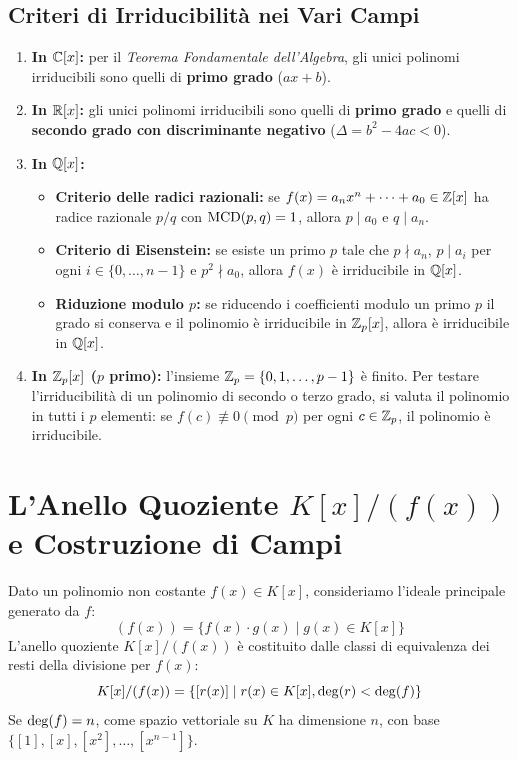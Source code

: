 \subsection{Criteri di Irriducibilità nei Vari Campi}
\begin{enumerate}
    \item \textbf{In $\mathbb{C}[x]$:} per il \emph{Teorema Fondamentale dell'Algebra}, gli unici polinomi irriducibili sono quelli di \textbf{primo grado} ($ax + b$).
    \item \textbf{In $\mathbb{R}[x]$:} gli unici polinomi irriducibili sono quelli di \textbf{primo grado} e quelli di \textbf{secondo grado con discriminante negativo} ($\Delta = b^2 - 4ac < 0$).
    \item \textbf{In $\mathbb{Q}[x]$:}
    \begin{itemize}
        \item \textbf{Criterio delle radici razionali:} se $f(x) = a_n x^n + \dots + a_0 \in \mathbb{Z}[x]$ ha radice razionale $p/q$ con $\operatorname{MCD}(p, q) = 1$, allora $p \mid a_0$ e $q \mid a_n$.
        \item \textbf{Criterio di Eisenstein:} se esiste un primo $p$ tale che $p \nmid a_n$, $p \mid a_i$ per ogni $i \in \{0, \dots, n-1\}$ e $p^2 \nmid a_0$, allora $f(x)$ è irriducibile in $\mathbb{Q}[x]$.
        \item \textbf{Riduzione modulo $p$:} se riducendo i coefficienti modulo un primo $p$ il grado si conserva e il polinomio è irriducibile in $\mathbb{Z}_p[x]$, allora è irriducibile in $\mathbb{Q}[x]$.
    \end{itemize}
    \item \textbf{In $\mathbb{Z}_p[x]$ ($p$ primo):} l'insieme $\mathbb{Z}_p = \{0, 1, \dots, p-1\}$ è finito. Per testare l'irriducibilità di un polinomio di secondo o terzo grado, si valuta il polinomio in tutti i $p$ elementi: se $f(c) \not\equiv 0 \pmod p$ per ogni $c \in \mathbb{Z}_p$, il polinomio è irriducibile.
\end{enumerate}

\section{L'Anello Quoziente $K[x]/(f(x))$ e Costruzione di Campi}

Dato un polinomio non costante $f(x) \in K[x]$, consideriamo l'ideale principale generato da $f$:
\[
    (f(x)) = \{f(x) \cdot g(x) \mid g(x) \in K[x]\}
\]
L'anello quoziente $K[x]/(f(x))$ è costituito dalle classi di equivalenza dei resti della divisione per $f(x)$:
\[
    K[x]/(f(x)) = \{[r(x)] \mid r(x) \in K[x], \operatorname{deg}(r) < \operatorname{deg}(f)\}
\]
Se $\operatorname{deg}(f) = n$, come spazio vettoriale su $K$ ha dimensione $n$, con base $\{[1], [x], [x^2], \dots, [x^{n-1}]\}$.


